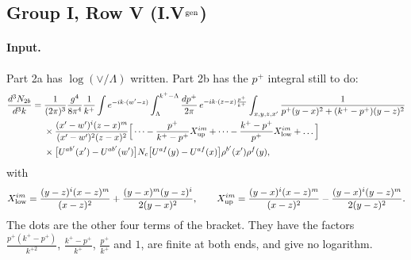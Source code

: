 \documentclass[10pt]{article}
\numberwithin{equation}{section}
\begin{document}
\subsection{Group I, Row V \texorpdfstring{(I.V$^{\rm gen}$)}{}}\label{src:g:I.V}
\paragraph{Input.} Part 2a has $\log(\vee/\Lambda)$ written. Part 2b has the $p^+$ integral still to do:
\begin{align}
\frac{d^3N_{2b}}{d^3k}={}&\frac{1}{(2\pi)^3}\frac{g^4}{8\pi^4}\frac1{k^+}\int e^{-ik\cdot(w'-z)}\int_\Lambda^{k^+-\Lambda}\frac{dp^+}{2\pi}\,e^{-ik\cdot(z-x)\frac{p^+}{k^+}}\int_{x,y,z,x'}\frac{1}{p^+(y-x)^2+(k^+-p^+)(y-z)^2}\notag\\
&\times\frac{(x'-w')^i(z-x)^m}{(x'-w')^2(z-x)^2}\Big[\dots-\frac{p^+}{k^+-p^+}X^{im}_{\rm up}+\dots-\frac{k^+-p^+}{p^+}X^{im}_{\rm low}+\dots\Big]\notag\\
&\times\big[U^{ab'}(x')-U^{ab'}(w')\big]N_c\big[U^{af}(y)-U^{af}(x)\big]\rho^{b'}(x')\rho^f(y),
\end{align}
with
\begin{equation}
X^{im}_{\rm low}=\frac{(y-z)^i(x-z)^m}{(x-z)^2}+\frac{(y-x)^m(y-z)^i}{2(y-x)^2},\qquad X^{im}_{\rm up}=\frac{(y-x)^i(x-z)^m}{(x-z)^2}-\frac{(y-x)^i(y-z)^m}{2(y-z)^2}.
\end{equation}
The dots are the other four terms of the bracket. They have the factors $\frac{p^+(k^+-p^+)}{k^{+2}}$, $\frac{k^+-p^+}{k^+}$, $\frac{p^+}{k^+}$ and $1$, are finite at both ends, and give no logarithm.
\end{document}
